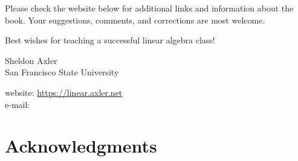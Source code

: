 {

Please check the website below for additional links and information about the book. Your suggestions, comments, and corrections are most welcome.

Best wishes for teaching a successful linear algebra class!

\medskip


\noindent
Sheldon Axler \\
San Francisco State University

\medskip

\noindent
website: \url{https://linear.axler.net} \\
e-mail: 

\pagebreak[3]

\chapter{Acknowledgments}

}
